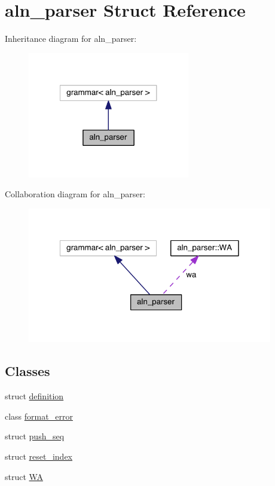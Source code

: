 \hypertarget{structaln__parser}{\section{aln\+\_\+parser Struct Reference}
\label{structaln__parser}
}


Inheritance diagram for aln\+\_\+parser\+:
\nopagebreak
\begin{figure}[H]
\begin{center}
\leavevmode
\includegraphics[width=200pt]{structaln__parser__inherit__graph}
\end{center}
\end{figure}


Collaboration diagram for aln\+\_\+parser\+:
\nopagebreak
\begin{figure}[H]
\begin{center}
\leavevmode
\includegraphics[width=303pt]{structaln__parser__coll__graph}
\end{center}
\end{figure}
\subsection*{Classes}
\begin{DoxyCompactItemize}
\item 
struct \hyperlink{structaln__parser_1_1definition}{definition}
\item 
class \hyperlink{classaln__parser_1_1format__error}{format\+\_\+error}
\item 
struct \hyperlink{structaln__parser_1_1push__seq}{push\+\_\+seq}
\item 
struct \hyperlink{structaln__parser_1_1reset__index}{reset\+\_\+index}
\item 
struct \hyperlink{structaln__parser_1_1_w_a}{W\+A}
\end{DoxyCompactItemize}
